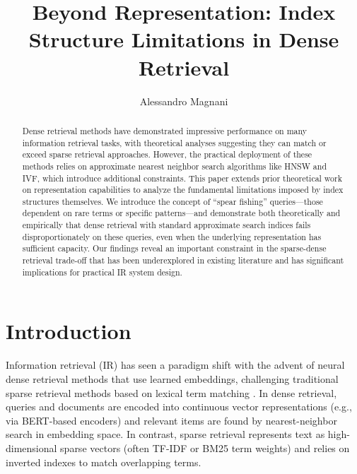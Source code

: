 \documentclass[manuscript]{acmart}
\begin{document}
\title{Beyond Representation: Index Structure Limitations in Dense Retrieval}

\author{Alessandro Magnani}

\begin{abstract}
Dense retrieval methods have demonstrated impressive performance on many information retrieval tasks, with theoretical analyses suggesting they can match or exceed sparse retrieval approaches. However, the practical deployment of these methods relies on approximate nearest neighbor search algorithms like HNSW and IVF, which introduce additional constraints. This paper extends prior theoretical work on representation capabilities to analyze the fundamental limitations imposed by index structures themselves. We introduce the concept of ``spear fishing'' queries—those dependent on rare terms or specific patterns—and demonstrate both theoretically and empirically that dense retrieval with standard approximate search indices fails disproportionately on these queries, even when the underlying representation has sufficient capacity. Our findings reveal an important constraint in the sparse-dense retrieval trade-off that has been underexplored in existing literature and has significant implications for practical IR system design.
\end{abstract}

\maketitle

\section{Introduction}
Information retrieval (IR) has seen a paradigm shift with the advent of neural dense retrieval methods that use learned embeddings, challenging traditional sparse retrieval methods based on lexical term matching \cite{karpukhin2020dense, xiong2021approximate}. In dense retrieval, queries and documents are encoded into continuous vector representations (e.g., via BERT-based encoders) and relevant items are found by nearest-neighbor search in embedding space. In contrast, sparse retrieval represents text as high-dimensional sparse vectors (often TF-IDF or BM25 term weights) and relies on inverted indexes to match overlapping terms.
\end{document}

